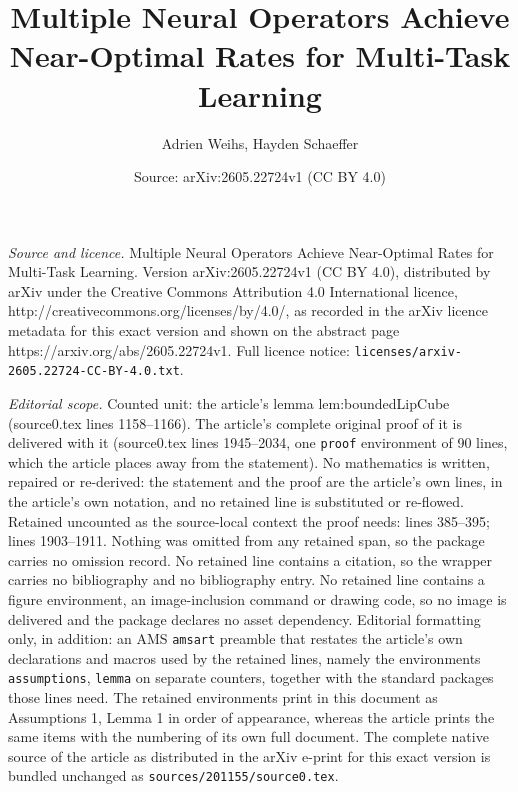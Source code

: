 \documentclass[10pt,a4paper]{amsart}
\title{Multiple Neural Operators Achieve Near-Optimal Rates for Multi-Task Learning}
\author{Adrien Weihs, Hayden Schaeffer}
\date{Source: arXiv:2605.22724v1 (CC BY 4.0)}
\begin{document}
\maketitle

\noindent\emph{Source and licence.} Multiple Neural Operators Achieve Near-Optimal Rates for Multi-Task Learning. Version arXiv:2605.22724v1 (CC BY 4.0), distributed by arXiv under the Creative Commons Attribution 4.0 International licence, http://creativecommons.org/licenses/by/4.0/, as recorded in the arXiv licence metadata for this exact version and shown on the abstract page https://arxiv.org/abs/2605.22724v1. Full licence notice: \texttt{licenses/arxiv-2605.22724-CC-BY-4.0.txt}.\par\smallskip

\noindent\textit{Editorial scope.} Counted unit: the article's lemma lem:boundedLipCube (source0.tex lines 1158--1166). The article's complete original proof of it is delivered with it (source0.tex lines 1945--2034, one \texttt{proof} environment of 90 lines, which the article places away from the statement). No mathematics is written, repaired or re-derived: the statement and the proof are the article's own lines, in the article's own notation, and no retained line is substituted or re-flowed.  Retained uncounted as the source-local context the proof needs: lines 385--395; lines 1903--1911.  Nothing was omitted from any retained span, so the package carries no omission record.  No retained line contains a citation, so the wrapper carries no bibliography and no bibliography entry.  No retained line contains a figure environment, an image-inclusion command or drawing code, so no image is delivered and the package declares no asset dependency.  Editorial formatting only, in addition: an AMS \texttt{amsart} preamble that restates the article's own declarations and macros used by the retained lines, namely the environments \texttt{assumptions}, \texttt{lemma} on separate counters, together with the standard packages those lines need.  The retained environments print in this document as Assumptions 1, Lemma 1 in order of appearance, whereas the article prints the same items with the numbering of its own full document.  The complete native source of the article as distributed in the arXiv e-print for this exact version is bundled unchanged as \texttt{sources/201155/source0.tex}.
\end{document}
